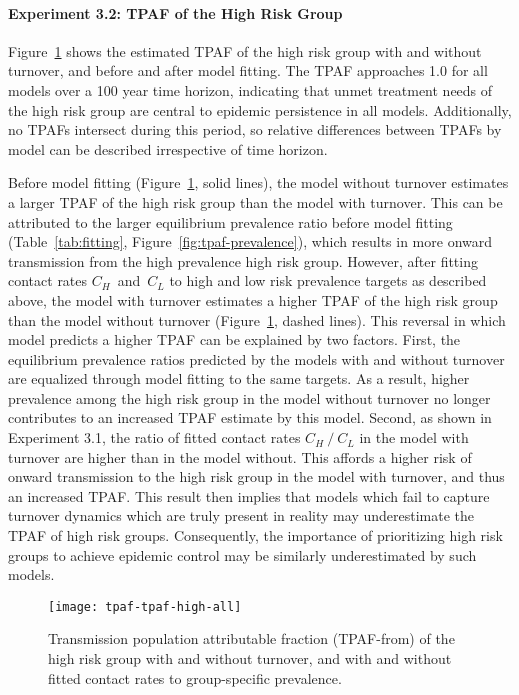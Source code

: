 \paragraph{Experiment 3.2: TPAF of the High Risk Group}
Figure~\ref{fig:tpaf} shows the estimated TPAF of the high risk group
with and without turnover, and before and after model fitting.
The TPAF approaches 1.0 for all models over a 100 year time horizon,
indicating that unmet treatment needs of the high risk group
are central to epidemic persistence in all models.
Additionally, no TPAFs intersect during this period,
so relative differences between TPAFs by model can be described irrespective of time horizon.
\par
Before model fitting (Figure~\ref{fig:tpaf}, solid lines),
the model without turnover estimates a larger TPAF of the high risk group
than the model with turnover.
This can be attributed to the larger equilibrium prevalence ratio before model fitting
(Table~\ref{tab:fitting}, Figure~\ref{fig:tpaf-prevalence}),
which results in more onward transmission from the high prevalence high risk group.
However, after fitting contact rates $C_H$~and~$C_L$ to
high and low risk prevalence targets as described above,
the model with turnover estimates a higher TPAF of the high risk group
than the model without turnover
(Figure~\ref{fig:tpaf}, dashed lines).
This reversal in which model predicts a higher TPAF can be explained by two factors.
First, the equilibrium prevalence ratios predicted by the models with and without turnover
are equalized through model fitting to the same targets.
As a result, higher prevalence among the high risk group in the model without turnover
no longer contributes to an increased TPAF estimate by this model.
Second, as shown in Experiment 3.1, 
the ratio of fitted contact rates $C_H~/~C_L$ in the model with turnover
are higher than in the model without.
This affords a higher risk of onward transmission to the high risk group
in the model with turnover, and thus an increased TPAF.
This result then implies that
models which fail to capture turnover dynamics which are truly present in reality
may underestimate the TPAF of high risk groups.
Consequently, the importance of prioritizing high risk groups
to achieve epidemic control may be similarly underestimated by such models.
\begin{figure}
  \centering
  \texttt{[image: tpaf-tpaf-high-all]}
  \caption{Transmission population attributable fraction (TPAF-from)
    of the high risk group with and without turnover,
    and with and without fitted contact rates to group-specific prevalence.}
  \label{fig:tpaf}
\end{figure}